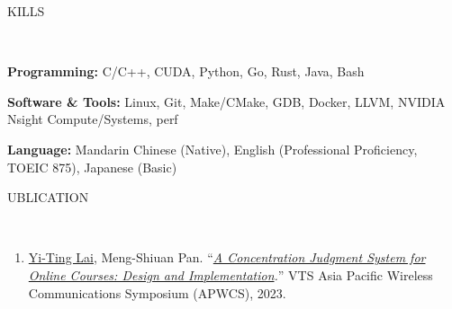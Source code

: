 \documentclass[11pt]{article}
\begin{document}


\newpage

\begin{center}
    \scalebox{1.3}{S}KILLS\raggedright \,\hrulefill
\end{center}
\textbf{Programming:} C/C++, CUDA, Python, Go, Rust, Java, Bash

\textbf{Software \& Tools:}  Linux, Git, Make/CMake, GDB, Docker, LLVM, NVIDIA Nsight Compute/Systems, perf

\textbf{Language:} Mandarin Chinese (Native), English (Professional Proficiency, TOEIC 875), Japanese (Basic)

\begin{center}
    \scalebox{1.3}{P}UBLICATION\raggedright \,\hrulefill
\end{center}

\begin{enumerate}[noitemsep, topsep=0pt, partopsep=0pt, parsep=0pt, leftmargin=*]
    \item \underline{Yi-Ting Lai}, Meng-Shiuan Pan. ``\textit{\href{https://ieeexplore.ieee.org/document/10234058}{A Concentration Judgment System for Online Courses: Design and Implementation}.}'' VTS Asia Pacific Wireless Communications Symposium (APWCS), 2023.
\end{enumerate}
\end{document}
